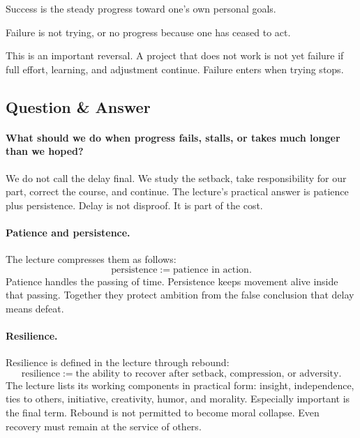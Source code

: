 \begin{definition}
Success is the steady progress toward one's own personal goals.
\end{definition}

\begin{definition}
Failure is not trying, or no progress because one has ceased to act.
\end{definition}

This is an important reversal. A project that does not work is not yet failure if full effort, learning, and adjustment continue. Failure enters when trying stops.

\subsection{Question \& Answer}

\paragraph{What should we do when progress fails, stalls, or takes much longer than we hoped?}
We do not call the delay final. We study the setback, take responsibility for our part, correct the course, and continue. The lecture's practical answer is patience plus persistence. Delay is not disproof. It is part of the cost.

\paragraph{Patience and persistence.}
The lecture compresses them as follows:
\begin{equation}
\text{persistence} := \text{patience in action}.
\end{equation}
Patience handles the passing of time. Persistence keeps movement alive inside that passing. Together they protect ambition from the false conclusion that delay means defeat.

\paragraph{Resilience.}
Resilience is defined in the lecture through rebound:
\begin{equation}
\text{resilience} := \text{the ability to recover after setback, compression, or adversity}.
\end{equation}
The lecture lists its working components in practical form: insight, independence, ties to others, initiative, creativity, humor, and morality. Especially important is the final term. Rebound is not permitted to become moral collapse. Even recovery must remain at the service of others.

